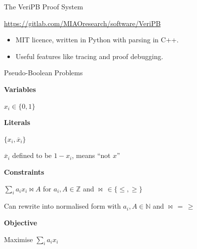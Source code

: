 \documentclass[aspectratio=169,compress,10pt]{beamer}
\begin{document}
\begin{frame}{The VeriPB Proof System}
    \begin{center}
        \url{https://gitlab.com/MIAOresearch/software/VeriPB} \\
        \bigskip
    \end{center}
    \begin{itemize}
        \item MIT licence, written in Python with parsing in C++.
        \item Useful features like tracing and proof debugging.
    \end{itemize}
\end{frame}

\begin{frame}{Pseudo-Boolean Problems}
    \begin{minipage}[t]{0.25\framewidth}
        \textcolor{uofgcobalt}{\textbf{Variables}}
    \end{minipage}\hfill\begin{minipage}[c]{0.70\framewidth}
        $x_i \in \{ 0, 1 \}$
    \end{minipage}\bigskip

    \begin{minipage}[t]{0.25\framewidth}
        \textcolor{uofgcobalt}{\textbf{Literals}}
    \end{minipage}\hfill\begin{minipage}[c]{0.70\framewidth}
        $\{ x_i, \overline{x}_i \}$

        \medskip

        $\overline{x}_i$ defined to be $1 - x_i$, means ``not $x$''
    \end{minipage}\bigskip

    \begin{minipage}[t]{0.25\framewidth}
        \textcolor{uofgcobalt}{\textbf{Constraints}}
    \end{minipage}\hfill\begin{minipage}[c]{0.70\framewidth}
        $\sum_i a_i x_i \bowtie A$ for $a_i, A \in \mathbb{Z}$ and $\bowtie \,\in \{ \le, \ge \}$

        \medskip
        Can rewrite into normalised form with $a_i, A \in \mathbb{N}$ and $\bowtie\,=\,\ge$
    \end{minipage}\bigskip

    \begin{minipage}[t]{0.25\framewidth}
        \textcolor{uofgcobalt}{\textbf{Objective}}
    \end{minipage}\hfill\begin{minipage}[c]{0.70\framewidth}
        Maximise $\sum_i a_i x_i$
    \end{minipage}\bigskip
\end{frame}
\end{document}
